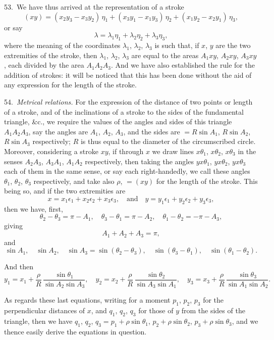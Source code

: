\documentclass[12pt,a4paper]{article}
\theoremstyle{definition}
\begin{document}
53.\ We have thus arrived at the representation of a stroke
\[
(xy) = (x_2 y_3 - x_3 y_2)\, \eta_1 + (x_3 y_1 - x_1 y_3)\, \eta_2 + (x_1 y_2 - x_2 y_1)\, \eta_3,
\]
or say
\[
\lambda = \lambda_1 \eta_1 + \lambda_2 \eta_2 + \lambda_3 \eta_3,
\]
where the meaning of the coordinates $\lambda_1$, $\lambda_2$, $\lambda_3$ is such that, if $x$, $y$
are the two extremities of the stroke, then $\lambda_1$, $\lambda_2$, $\lambda_3$ are equal to the areas
$A_1 xy$, $A_2 xy$, $A_3 xy$, each divided by the area $A_1 A_2 A_3$.
And we have also established the rule for the addition of strokes: it will be noticed
that this has been done without the aid of any expression for the length of the stroke.

54.\ \textit{Metrical relations.} For the expression of the distance of two points or length
of a stroke, and of the inclinations of a stroke to the sides of the fundamental triangle,
\&c., we require the values of the angles and sides of this triangle $A_1 A_2 A_3$, say the
angles are $A_1$, $A_2$, $A_3$, and the sides are $= R \sin A_1$, $R \sin A_2$, $R \sin A_3$
respectively; $R$ is thus equal to the diameter of the circumscribed circle.
Moreover, considering a stroke $xy$, if through $x$ we draw lines $x\theta_1$, $x\theta_2$, $x\theta_3$
in the senses $A_2 A_3$, $A_3 A_1$, $A_1 A_2$ respectively, then taking the angles
$yx\theta_1$, $yx\theta_2$, $yx\theta_3$ each of them in the same sense, or say each right-handedly,
we call these angles $\theta_1$, $\theta_2$, $\theta_3$ respectively, and take also $\rho$, $= (xy)$ for
the length of the stroke. This being so, and if the two extremities are
\[
x = x_1 \epsilon_1 + x_2 \epsilon_2 + x_3 \epsilon_3, \quad \text{and} \quad
y = y_1 \epsilon_1 + y_2 \epsilon_2 + y_3 \epsilon_3,
\]
then we have, first,
\[
\theta_2 - \theta_3 = \pi - A_1, \quad
\theta_3 - \theta_1 = \pi - A_2, \quad
\theta_1 - \theta_2 = -\pi - A_3,
\]
giving
\[
A_1 + A_2 + A_3 = \pi,
\]
and
\[
\sin A_1, \quad \sin A_2, \quad \sin A_3
= \sin(\theta_2 - \theta_3), \quad \sin(\theta_3 - \theta_1), \quad \sin(\theta_1 - \theta_2).
\]

And then
\[
y_1 = x_1 + \frac{\rho}{R}\, \frac{\sin \theta_1}{\sin A_2 \sin A_3}, \quad
y_2 = x_2 + \frac{\rho}{R}\, \frac{\sin \theta_2}{\sin A_3 \sin A_1}, \quad
y_3 = x_3 + \frac{\rho}{R}\, \frac{\sin \theta_3}{\sin A_1 \sin A_2}.
\]

As regards these last equations, writing for a moment $p_1$, $p_2$, $p_3$ for the perpendicular
distances of $x$, and $q_1$, $q_2$, $q_3$ for those of $y$ from the sides of the triangle,
then we have $q_1$, $q_2$, $q_3 = p_1 + \rho \sin \theta_1$, $p_2 + \rho \sin \theta_2$,
$p_3 + \rho \sin \theta_3$, and we thence easily derive the equations in question.
\end{document}
